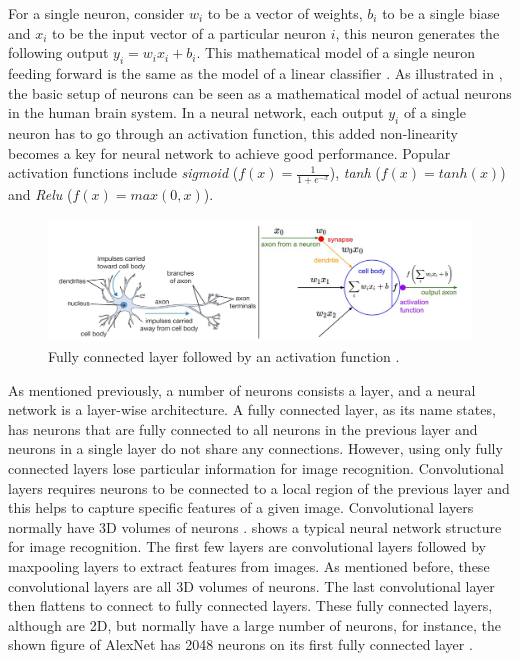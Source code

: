 \documentclass[a4paper,12pt]{report}
\begin{document}
For a single neuron, consider $w_{i}$ to be a vector of weights, $b_{i}$ to be a single biase and $x_{i}$
to be the input vector of a particular neuron $i$, this neuron generates the
following output $y_{i} = w_{i}x_{i} + b_{i}$.
This mathematical model of a single neuron feeding forward is the same as the
model of a linear classifier \cite{Mladenic}.
As illustrated in , the basic setup of neurons can be seen as
a mathematical model of actual neurons in the human brain system.
In a neural network, each output $y_{i}$ of a single neuron has to go through
an activation function, this added non-linearity becomes a key for neural network
to achieve good performance.
Popular activation functions include \textit{sigmoid} ($f(x) = \frac{1}{1+e^{-x}}$),
\textit{tanh} ($f(x) = tanh(x)$) and \textit{Relu} ($f(x) = max(0,x)$).

\begin{figure}[!ht]
  \includegraphics[width=\textwidth]{fig_neuron.png}
  \caption{Fully connected layer followed by an activation function \cite{Krizhevsky}.}
  \label{fig:neuron}
\end{figure}

As mentioned previously, a number of neurons consists a layer, and a neural network
is a layer-wise architecture.
A fully connected layer, as its name states, has neurons that are fully connected
to all neurons in the previous layer and neurons in a single layer do not share
any connections.
However, using only fully connected layers lose particular information for image
recognition.
Convolutional layers requires neurons to be connected to a local region of the
previous layer and this helps to capture specific features of a given image.
Convolutional layers normally have 3D volumes of neurons \cite{Krizhevsky}.
 shows a typical neural network structure for image recognition.
The first few layers are convolutional layers followed by maxpooling layers to
extract features from images.
As mentioned before, these convolutional layers are all 3D volumes of neurons.
The last convolutional layer then flattens to connect to fully connected layers.
These fully connected layers, although are 2D, but normally have a large number
of neurons, for instance, the shown figure of AlexNet has 2048 neurons on its
first fully connected layer \cite{Krizhevsky}.
\end{document}
